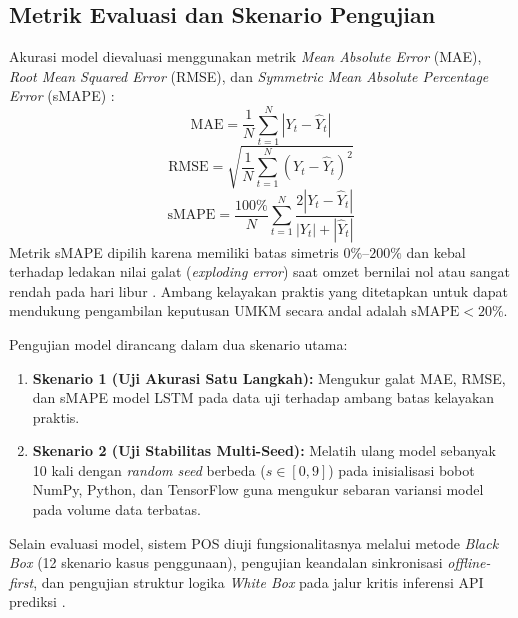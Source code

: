 \documentclass[10pt,a4paper]{article}
\begin{document}
\subsection{Metrik Evaluasi dan Skenario Pengujian}

Akurasi model dievaluasi menggunakan metrik \textit{Mean Absolute Error} (MAE), \textit{Root Mean Squared Error} (RMSE), dan \textit{Symmetric Mean Absolute Percentage Error} (sMAPE) \cite{hyndman2006another}:
\begin{equation}
  \text{MAE} = \frac{1}{N}\sum_{t=1}^{N} |Y_t - \hat{Y}_t|
  \label{eq:mae}
\end{equation}
\begin{equation}
  \text{RMSE} = \sqrt{\frac{1}{N}\sum_{t=1}^{N} (Y_t - \hat{Y}_t)^2}
  \label{eq:rmse}
\end{equation}
\begin{equation}
  \text{sMAPE} = \frac{100\%}{N}\sum_{t=1}^{N} \frac{2|Y_t - \hat{Y}_t|}{|Y_t| + |\hat{Y}_t|}
  \label{eq:smape}
\end{equation}
Metrik sMAPE dipilih karena memiliki batas simetris $0\%$--$200\%$ dan kebal terhadap ledakan nilai galat (\textit{exploding error}) saat omzet bernilai nol atau sangat rendah pada hari libur \cite{hyndman2006another}. Ambang kelayakan praktis yang ditetapkan untuk dapat mendukung pengambilan keputusan UMKM secara andal adalah $\text{sMAPE} < 20\%$.

Pengujian model dirancang dalam dua skenario utama:
\begin{enumerate}
  \item \textbf{Skenario 1 (Uji Akurasi Satu Langkah):} Mengukur galat MAE, RMSE, dan sMAPE model LSTM pada data uji terhadap ambang batas kelayakan praktis.
  \item \textbf{Skenario 2 (Uji Stabilitas Multi-Seed):} Melatih ulang model sebanyak 10 kali dengan \textit{random seed} berbeda ($s \in [0, 9]$) pada inisialisasi bobot NumPy, Python, dan TensorFlow guna mengukur sebaran variansi model pada volume data terbatas.
\end{enumerate}

Selain evaluasi model, sistem POS diuji fungsionalitasnya melalui metode \textit{Black Box} (12 skenario kasus penggunaan), pengujian keandalan sinkronisasi \textit{offline-first}, dan pengujian struktur logika \textit{White Box} pada jalur kritis inferensi API prediksi \cite{myers2011art, pressman2020software}.

\end{document}
